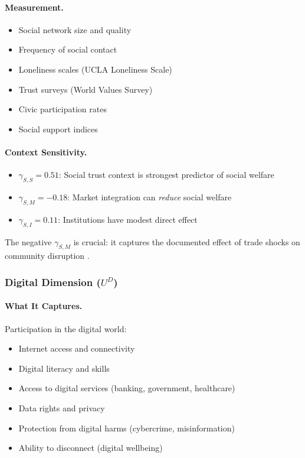 \paragraph{Measurement.}
\begin{itemize}
\item Social network size and quality
\item Frequency of social contact
\item Loneliness scales (UCLA Loneliness Scale)
\item Trust surveys (World Values Survey)
\item Civic participation rates
\item Social support indices
\end{itemize}

\paragraph{Context Sensitivity.}
\begin{itemize}
\item $\gamma_{S,S} = 0.51$: Social trust context is strongest predictor of social welfare
\item $\gamma_{S,M} = -0.18$: Market integration can \emph{reduce} social welfare
\item $\gamma_{S,I} = 0.11$: Institutions have modest direct effect
\end{itemize}

The negative $\gamma_{S,M}$ is crucial: it captures the documented effect of 
trade shocks on community disruption \citep{autor2013china}.

\subsubsection{Digital Dimension ($U^D$)}

\paragraph{What It Captures.}
Participation in the digital world:
\begin{itemize}
\item Internet access and connectivity
\item Digital literacy and skills
\item Access to digital services (banking, government, healthcare)
\item Data rights and privacy
\item Protection from digital harms (cybercrime, misinformation)
\item Ability to disconnect (digital wellbeing)
\end{itemize}

